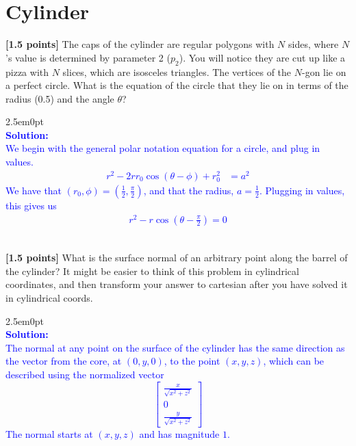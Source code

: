 \documentclass[10pt,twocolumn]{article}
\newcommand{\solution}[1]{\begin{adjustwidth}{2.5em}{0pt}\textcolor{Blue}{\\{\bf Solution:} \\ #1}\\[5mm] \end{adjustwidth}}  %
\begin{document}
\section{Cylinder}
{\bf [1.5 points]} The caps of the cylinder are regular polygons with $N$ sides, where $N$'s value is determined by parameter 2 ($p_2$). You will notice they are cut up like a pizza with $N$ slices, which are isosceles triangles. The vertices of the $N$-gon lie on a perfect circle. What is the equation of the circle that they lie on  in terms of the radius (0.5) and the angle $\theta$?
\solution{
We begin with the general polar notation equation for a circle, and plug in values.
\begin{align*}
r^2 - 2 r r_0 \cos{\left(\theta - \phi\right)} + r_0 ^2 &= a^2
\end{align*}
We have that $(r_0, \phi) = (\frac{1}{2}, \frac{\pi}{2})$, and that the radius, $a = \frac{1}{2}$. Plugging in values, this gives us
\begin{align*}
r^2 - r \cos\left(\theta - \frac{\pi}{2}\right) = 0
\end{align*}
}

{\bf [1.5 points]} What is the surface normal of an arbitrary point along the barrel of the cylinder? It might be easier to think of this problem in cylindrical coordinates, and then transform your answer to cartesian after you have solved it in cylindrical coords.
\solution {
The normal at any point on the surface of the cylinder has the same direction as
the vector from the core, at $(0, y, 0)$, to the point $(x, y, z)$, which can be
described using the normalized vector 
\[ \begin{bmatrix} 
  \frac{x}{\sqrt{x^2+z^2}} \\ 
  0 \\
  \frac{y}{\sqrt{x^2+z^2}}
\end{bmatrix} \]
The normal starts at $(x, y, z)$ and has magnitude $1$.
}
\end{document}
